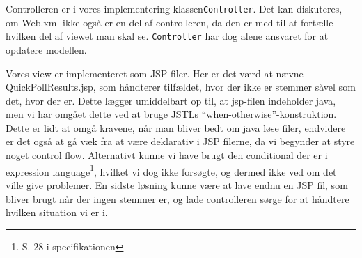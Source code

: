 \documentclass[a4paper,10pt]{article}
\begin{document}
Controlleren er i vores implementering  klassen\texttt{Controller}. Det kan diskuteres, om Web.xml ikke også er en del af controlleren, da den er med til at fortælle hvilken del af viewet man skal se. \texttt{Controller} har dog alene ansvaret for at opdatere modellen.

Vores view er implementeret som JSP-filer. Her er det værd at nævne QuickPollResults.jsp, som håndterer tilfældet, hvor der ikke er stemmer såvel som det, hvor der er. Dette lægger umiddelbart op til, at jsp-filen indeholder java, men vi har omgået dette ved at bruge JSTLs ``when-otherwise''-konstruktion. Dette er lidt at omgå kravene, når man bliver bedt om java løse filer, endvidere er det også at gå væk fra at være deklarativ i JSP filerne, da vi begynder at styre noget control flow. Alternativt kunne vi have brugt den conditional der er i expression language\footnote{S. 28 i specifikationen}, hvilket vi dog ikke forsøgte, og dermed ikke ved om det ville give problemer. En sidste løsning kunne være at lave endnu en JSP fil, som bliver brugt når der ingen stemmer er, og lade controlleren sørge for at håndtere hvilken situation vi er i.


\end{document}
